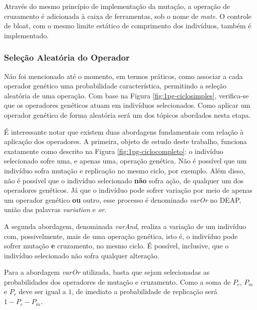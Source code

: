 
Através do mesmo princípio de implementação da mutação, a operação de cruzamento é adicionada à caixa de ferramentas, sob o nome de \textit{mate}. O controle de bloat, com o mesmo limite estático de comprimento dos indivíduos, também é implementado.

\subsubsection{Seleção Aleatória do Operador}\label{sssec:3deap-selecOperadorGen}

Não foi mencionado até o momento, em termos práticos, como associar a cada operador genético uma probabilidade característica, permitindo a seleção aleatória de uma operação. Com base na Figura \ref{fig:1pg-ciclosimples}, verifica-se que os operadores genéticos atuam em indivíduos selecionados. Como aplicar um operador genético de forma aleatória será um dos tópicos abordados nesta etapa.

É interessante notar que existem duas abordagens fundamentais com relação à aplicação dos operadores. A primeira, objeto de estudo deste trabalho, funciona exatamente como descrito na Figura \ref{fig:1pg-ciclocompleto}: o indivíduo selecionado sofre uma, e apenas uma, operação genética. Não é possível que um indivíduo sofra mutação e replicação no mesmo ciclo, por exemplo. Além disso, não é possível que o indivíduo selecionado \textbf{não} sofra ação, de qualquer um dos operadores genéticos. Já que o indivíduo pode sofrer variação por meio de apenas um operador genético \textbf{ou} outro, esse processo é denominado \textit{varOr} no DEAP, união das palavras \textit{variation} e \textit{or}.

A segunda abordagem, denominada \textit{varAnd}, realiza a variação de um indivíduo com, possivelmente, mais de uma operação genética, isto é, o indivíduo pode sofrer mutação \textbf{e} cruzamento, no mesmo ciclo. É possível, inclusive, que o indivíduo selecionado não sofra qualquer alteração.

Para a abordagem \textit{varOr} utilizada, basta que sejam selecionadas as probabilidades dos operadores de mutação e cruzamento. Como a soma de $P_c$, $P_m$ e $P_r$ deve ser igual a $1$, de imediato a probabilidade de replicação será $1-P_c-P_m$.

